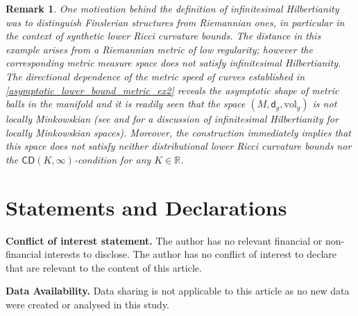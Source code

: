 \documentclass[a4paper,10pt]{article}
\newtheorem{remark}[theorem]{Remark}
\numberwithin{equation}{section}
\newcommand{\R}{\mathbb{R}}
\newcommand{\vol}{\mathrm{vol}}
\newcommand{\cd}{\mathsf{CD}}
\newcommand{\sfd}{\mathsf d}
\begin{document}
\begin{remark}
    One motivation behind the definition of infinitesimal Hilbertianity was to distinguish Finslerian structures from Riemannian ones, in particular in the context of synthetic lower Ricci curvature bounds. The distance in this example arises from a Riemannian metric of low regularity; however the corresponding metric measure space does not satisfy infinitesimal Hilbertianity.
    The directional dependence of the metric speed of curves established in \eqref{asymptotic_lower_bound_metric_ex2} reveals the asymptotic shape of metric balls in the manifold and it is readily seen that the space $(M, \sfd_g, \vol_g)$ is not locally Minkowskian (see \cite{ohta2012non} and \cite{magnabosco2025canonical} for a discussion of infinitesimal Hilbertianity for locally Minkowskian spaces).  
    Moreover, the construction immediately implies that this space does not satisfy neither distributional lower Ricci curvature bounds nor the $\cd(K, \infty)$-condition for any $K \in \R$.
\end{remark}
\section*{Statements and Declarations}
\textbf{Conflict of interest statement.} The author has no relevant financial or non-financial
interests to disclose. The author has no conflict of interest to declare that are relevant to the content of this article.

\textbf{Data Availability.} Data sharing is not applicable to this article as no new data were created or analysed in this study.

{}


\end{document}
